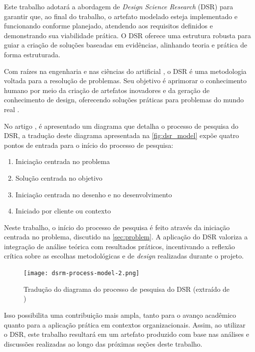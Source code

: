 \documentclass[a4paper, 12pt]{article}
\newcommand{\citeb}[1]{\bibleftbracket\cite{#1}\bibrightbracket}
\begin{document}
    Este trabalho adotará a abordagem de \textit{Design Science Research} (DSR) para garantir que, ao final do trabalho, o artefato modelado esteja implementado e funcionando conforme planejado, atendendo aos requisitos definidos e demonstrando sua viabilidade prática. O DSR oferece uma estrutura robusta para guiar a criação de soluções baseadas em evidências, alinhando teoria e prática de forma estruturada.

    Com raízes na engenharia e nas ciências do artificial \citeb{simon_1996}, o DSR é uma metodologia voltada para a resolução de problemas. Seu objetivo é aprimorar o conhecimento humano por meio da criação de artefatos inovadores e da geração de conhecimento de design, oferecendo soluções práticas para problemas do mundo real \citeb{design_science}. 
    
    No artigo  \citeb{dsr}, é apresentado um diagrama que detalha o processo de pesquisa do DSR, a tradução deste diagrama apresentada na \autoref{fig:dsr_model} expõe quatro pontos de entrada para o início do processo de pesquisa:
    
    \begin{enumerate}
        \item Iniciação centrada no problema
        \item Solução centrada no objetivo
        \item Iniciação centrada no desenho e no desenvolvimento
        \item Iniciado por cliente ou contexto
    \end{enumerate}
    
    Neste trabalho, o início do processo de pesquisa é feito através da iniciação centrada no problema, discutido na \autoref{sec:problem}. A aplicação do DSR valoriza a integração de análise teórica com resultados práticos, incentivando a reflexão crítica sobre as escolhas metodológicas e de \textit{design} realizadas durante o projeto.
    
    \begin{figure}[ht]
        \texttt{[image: dsrm-process-model-2.png]}
        \centering
        \caption{Tradução do diagrama do processo de pesquisa do DSR (extraído de \citeb{dsr})}
        \centering
        \label{fig:dsr_model}
    \end{figure}  

    Isso possibilita uma contribuição mais ampla, tanto para o avanço acadêmico quanto para a aplicação prática em contextos organizacionais. Assim, ao utilizar o DSR, este trabalho resultará em um artefato produzido com base nas análises e discussões realizadas ao longo das próximas seções deste trabalho.
    
\end{document}
